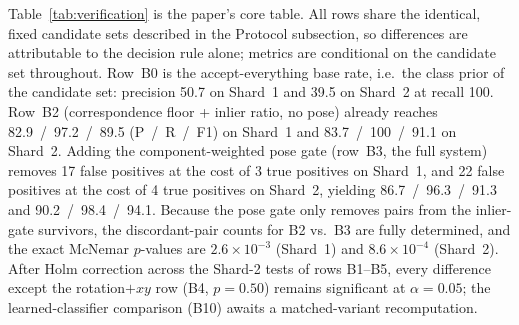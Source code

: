 \documentclass[letterpaper]{article} %
\begin{document}
Table~\ref{tab:verification} is the paper's core table. All rows share
the identical, fixed candidate sets described in the Protocol subsection,
so differences are attributable to the decision rule alone; metrics are
conditional on the candidate set throughout. Row~B0 is the
accept-everything base rate, i.e.\ the class prior of the candidate set:
precision 50.7 on Shard~1 and 39.5 on Shard~2 at recall 100. Row~B2
(correspondence floor + inlier ratio, no pose) already reaches
82.9~/~97.2~/~89.5 (P~/~R~/~F1) on Shard~1 and 83.7~/~100~/~91.1 on
Shard~2. Adding the component-weighted pose gate (row~B3, the full
system) removes 17 false positives at the cost of 3 true positives on
Shard~1, and 22 false positives at the cost of 4 true positives on
Shard~2, yielding 86.7~/~96.3~/~91.3 and 90.2~/~98.4~/~94.1. Because the
pose gate only removes pairs from the inlier-gate survivors, the
discordant-pair counts for B2 vs.\ B3 are fully determined, and the exact
McNemar $p$-values are $2.6\times10^{-3}$ (Shard~1) and
$8.6\times10^{-4}$ (Shard~2). After Holm correction across the Shard-2
tests of rows B1--B5, every difference except the rotation$+xy$ row (B4,
$p=0.50$) remains significant at $\alpha=0.05$; the learned-classifier
comparison (B10) awaits a matched-variant recomputation.
\end{document}
